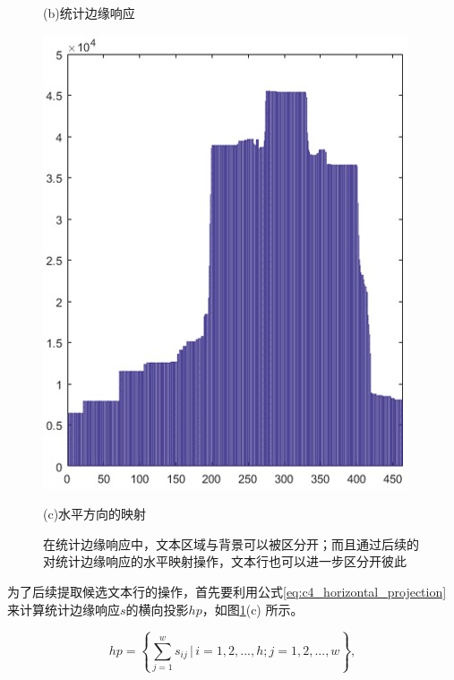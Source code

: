 \begin{figure}[!h]
\begin{minipage}[t]{0.35\linewidth}
        \centerline{\small (b)统计边缘响应}
        \end{minipage}
        \begin{minipage}[t]{0.25\linewidth}
        \centering
        \includegraphics[width=\textwidth]{./figures/c4_horizontal_projection.jpg}
        \centerline{\small (c)水平方向的映射}
        \end{minipage}
        \caption{在统计边缘响应中，文本区域与背景可以被区分开；而且通过后续的对统计边缘响应的水平映射操作，文本行也可以进一步区分开彼此}
        \label{fig.c4_static_skeleton_response}
        \end{figure}

        为了后续提取候选文本行的操作，首先要利用公式\ref{eq:c4_horizontal_projection} 来计算统计边缘响应$s$的横向投影$hp$，如图\ref{fig.c4_static_skeleton_response}(c) 所示。

        \begin{equation}
        hp= \left\{ \sum_{j=1}^w s_{ij} \, | \, i=1,2,...,h;j=1,2,...,w \right\},
        \label{eq:c4_horizontal_projection}
        \end{equation}

